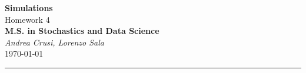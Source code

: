 \documentclass[12pt]{article}
\begin{document}
	\textcolor{UM_Brown}{
		\begin{center}
			\textbf{\Large Simulations}\\
			\vspace{5pt}
			Homework 4 \\
			\vspace{5pt}
			\textbf{M.S. in Stochastics and Data Science}\\
			\vspace{20pt}
			\textit{Andrea Crusi, Lorenzo Sala} \\
			\vspace{5pt}
			\today
		\end{center}
		\vspace{10pt}
		\hrule
	}
	
	
	
\end{document}
